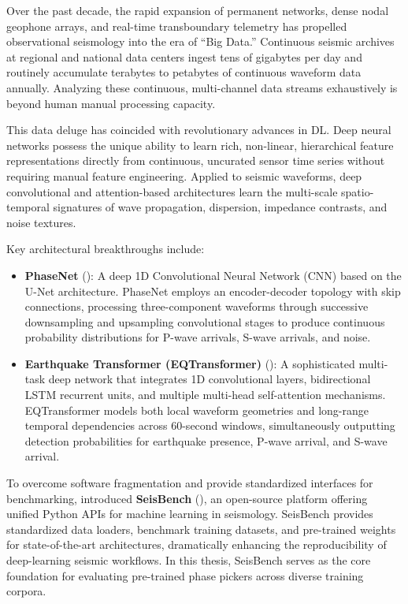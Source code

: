 Over the past decade, the rapid expansion of permanent networks, dense nodal geophone arrays, and real-time transboundary telemetry has propelled observational seismology into the era of ``Big Data.'' Continuous seismic archives at regional and national data centers ingest tens of gigabytes per day and routinely accumulate terabytes to petabytes of continuous waveform data annually. Analyzing these continuous, multi-channel data streams exhaustively is beyond human manual processing capacity.

This data deluge has coincided with revolutionary advances in \acf{DL}. Deep neural networks possess the unique ability to learn rich, non-linear, hierarchical feature representations directly from continuous, uncurated sensor time series without requiring manual feature engineering. Applied to seismic waveforms, deep convolutional and attention-based architectures learn the multi-scale spatio-temporal signatures of wave propagation, dispersion, impedance contrasts, and noise textures.

Key architectural breakthroughs include:
\begin{itemize}
  \item \textbf{PhaseNet} (\cite{PhaseNet}): A deep 1D Convolutional Neural Network (\ac{CNN}) based on the U-Net architecture. PhaseNet employs an encoder-decoder topology with skip connections, processing three-component waveforms through successive downsampling and upsampling convolutional stages to produce continuous probability distributions for P-wave arrivals, S-wave arrivals, and noise.
  \item \textbf{Earthquake Transformer (\ac{EQTransformer})} (\cite{EQTransformer}): A sophisticated multi-task deep network that integrates 1D convolutional layers, bidirectional \ac{LSTM} recurrent units, and multiple multi-head self-attention mechanisms. EQTransformer models both local waveform geometries and long-range temporal dependencies across 60-second windows, simultaneously outputting detection probabilities for earthquake presence, P-wave arrival, and S-wave arrival.
\end{itemize}

To overcome software fragmentation and provide standardized interfaces for benchmarking, \textcite{SeisBench} introduced \textbf{SeisBench} (\cite{SeisBench}), an open-source platform offering unified Python APIs for machine learning in seismology. SeisBench provides standardized data loaders, benchmark training datasets, and pre-trained weights for state-of-the-art architectures, dramatically enhancing the reproducibility of deep-learning seismic workflows. In this thesis, SeisBench serves as the core foundation for evaluating pre-trained phase pickers across diverse training corpora.

